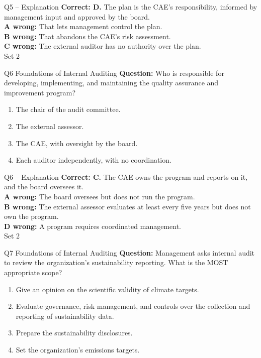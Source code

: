 \documentclass[aspectratio=169,10pt]{beamer}
\begin{document}
\begin{frame}[t]{Q5 -- Explanation}
	\footnotesize
	\textbf{Correct: D.} The plan is the CAE's responsibility, informed by management input and approved by the board. \\[5pt]
\textbf{A wrong:} That lets management control the plan. \\[3pt]
\textbf{B wrong:} That abandons the CAE's risk assessment. \\[3pt]
\textbf{C wrong:} The external auditor has no authority over the plan. \\[3pt]
	\vfill {\tiny Set 2}
\end{frame}

\begin{frame}[t]{Q6 \hfill {\scriptsize Foundations of Internal Auditing}}
	\small
	\textbf{Question:} Who is responsible for developing, implementing, and maintaining the quality assurance and improvement program?
	\begin{enumerate}[label=\Alph*.,itemsep=1pt,topsep=3pt]
			\item The chair of the audit committee.
			\item The external assessor.
			\item The CAE, with oversight by the board.
			\item Each auditor independently, with no coordination.
	\end{enumerate}
\end{frame}

\begin{frame}[t]{Q6 -- Explanation}
	\footnotesize
	\textbf{Correct: C.} The CAE owns the program and reports on it, and the board oversees it. \\[5pt]
\textbf{A wrong:} The board oversees but does not run the program. \\[3pt]
\textbf{B wrong:} The external assessor evaluates at least every five years but does not own the program. \\[3pt]
\textbf{D wrong:} A program requires coordinated management. \\[3pt]
	\vfill {\tiny Set 2}
\end{frame}

\begin{frame}[t]{Q7 \hfill {\scriptsize Foundations of Internal Auditing}}
	\small
	\textbf{Question:} Management asks internal audit to review the organization's sustainability reporting. What is the MOST appropriate scope?
	\begin{enumerate}[label=\Alph*.,itemsep=1pt,topsep=3pt]
			\item Give an opinion on the scientific validity of climate targets.
			\item Evaluate governance, risk management, and controls over the collection and reporting of sustainability data.
			\item Prepare the sustainability disclosures.
			\item Set the organization's emissions targets.
	\end{enumerate}
\end{frame}
\end{document}
